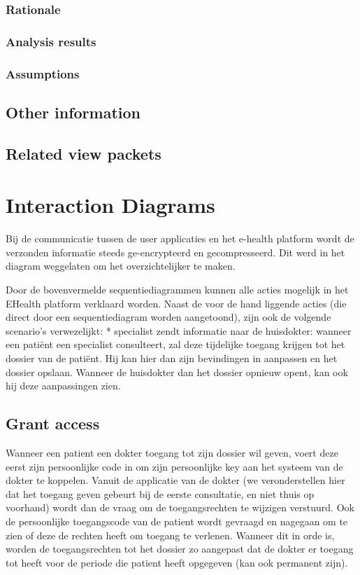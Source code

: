 \documentclass[a4paper,10pt]{article}
\begin{document}
\subsubsection{Rationale}

\subsubsection{Analysis results}

\subsubsection{Assumptions}

\subsection{Other information}

\subsection{Related view packets}



\clearpage
\section{Interaction Diagrams}
Bij de communicatie tussen de user applicaties en het e-health platform wordt de verzonden informatie steeds ge-encrypteerd en gecompresseerd. Dit werd in het diagram weggelaten om het overzichtelijker te maken. 

Door de bovenvermelde sequentiediagrammen kunnen alle acties mogelijk in het EHealth platform verklaard worden. 
Naast de voor de hand liggende acties (die direct door een sequentiediagram worden aangetoond), zijn ook de volgende scenario's verwezelijkt: 
* specialist zendt informatie naar de huisdokter:
	wanneer een patiënt een specialist consulteert, zal deze tijdelijke toegang krijgen tot het dossier van de patiënt. Hij kan hier dan zijn bevindingen in aanpassen en het dossier opslaan. Wanneer de huisdokter dan het dossier opnieuw opent, kan ook hij deze aanpassingen zien. 

\subsection{Grant access}
Wanneer een patient een dokter toegang tot zijn dossier wil geven, voert deze eerst zijn persoonlijke code in om zijn persoonlijke key aan het systeem van de dokter te koppelen. Vanuit de applicatie van de dokter (we veronderstellen hier dat het toegang geven gebeurt bij de eerste consultatie, en niet thuis op voorhand) wordt dan de vraag om de toegangsrechten te wijzigen verstuurd. Ook de persoonlijke toegangscode van de patient wordt gevraagd en nagegaan om te zien of deze de rechten heeft om toegang te verlenen. Wanneer dit in orde is, worden de toegangsrechten tot het dossier zo aangepast dat de dokter er toegang tot heeft voor de periode die patient heeft opgegeven (kan ook permanent zijn). 
\end{document}
